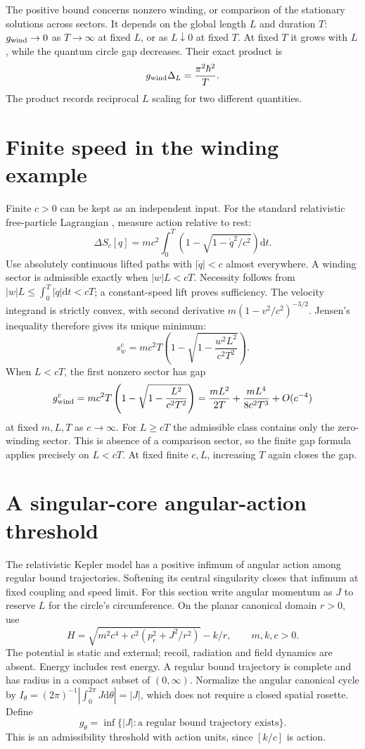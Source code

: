 \documentclass[11pt,a4paper]{article}
\newcommand{\dd}{\mathrm{d}}
\begin{document}
The positive bound concerns nonzero winding, or comparison of the stationary
solutions across sectors. It depends on the global length $L$ and duration $T$:
$g_{\rm wind}\to0$ as $T\to\infty$ at fixed $L$, or as $L\downarrow0$ at fixed
$T$. At fixed $T$ it grows with $L$, while the quantum circle gap decreases.
Their exact product is
\[
 g_{\rm wind}\Delta_L=\frac{\pi^2\hbar^2}{T}.
\]
The product records reciprocal $L$ scaling for two different quantities.

\section{Finite speed in the winding example}
Finite $c>0$ can be kept as an independent input. For the standard relativistic
free-particle Lagrangian \cite{FeynmanLectures}, measure action relative to rest:
\[
 \Delta S_c[q]=mc^2\int_0^T\left(1-\sqrt{1-\dot q^2/c^2}\right)\dd t.
\]
Use absolutely continuous lifted paths with $|\dot q|<c$ almost everywhere.
A winding sector is admissible exactly when $|w|L<cT$. Necessity follows
from $|w|L\le\int_0^T|\dot q|\dd t<cT$; a constant-speed lift proves
sufficiency. The velocity integrand is strictly convex, with second derivative
$m(1-v^2/c^2)^{-3/2}$. Jensen's inequality therefore gives its unique minimum:
\[
 s^c_w=mc^2T\left(1-\sqrt{1-\frac{w^2L^2}{c^2T^2}}\right).
\]
When $L<cT$, the first nonzero sector has gap
\[
 g^c_{\rm wind}=mc^2T\left(1-\sqrt{1-\frac{L^2}{c^2T^2}}\right)
 =\frac{mL^2}{2T}+\frac{mL^4}{8c^2T^3}+O(c^{-4})
\]
at fixed $m,L,T$ as $c\to\infty$. For $L\ge cT$ the admissible class contains
only the zero-winding sector. This is absence of a comparison sector, so the
finite gap formula applies precisely on $L<cT$.
At fixed finite $c,L$, increasing $T$ again closes the gap.

\section{A singular-core angular-action threshold}
The relativistic Kepler model has a positive infimum of angular action among
regular bound trajectories. Softening its central singularity closes that
infimum at fixed coupling and speed limit. For this section write angular
momentum as $J$ to reserve $L$ for the circle's circumference. On the planar
canonical domain $r>0$, use
\[
 H=\sqrt{m^2c^4+c^2(p_r^2+J^2/r^2)}-k/r,\qquad m,k,c>0.
\]
The potential is static and external; recoil, radiation and field dynamics
are absent. Energy includes rest energy. A regular bound trajectory is complete
and has radius in a compact subset of $(0,\infty)$. Normalize the angular
canonical cycle by $I_\theta=(2\pi)^{-1}|\int_0^{2\pi}J\dd\theta|=|J|$,
which does not require a closed spatial rosette. Define
\[
 g_\theta=\inf\{|J|:\text{a regular bound trajectory exists}\}.
\]
This is an admissibility threshold with action units, since $[k/c]$ is action.
\end{document}
